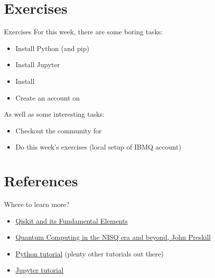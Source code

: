 \documentclass[aspectratio=43]{beamer}
\begin{document}
\section{Exercises}
\begin{frame}{Exercises}
    For this week, there are some boring tasks:
    \begin{itemize}
        \item Install Python (and pip)
        \item Install Jupyter
        \item Install \qk
        \item Create an account on \ibmqe
    \end{itemize}
    As well as some interesting tasks:
    \begin{itemize}
        \item Checkout the community for \qk
        \item Do this week's exercises (local setup of IBMQ account)
    \end{itemize}
\pagenumber
\end{frame}

        
        

\section{References}
\begin{frame}{Where to learn more?}
\begin{card}
    \begin{itemize}
        \item \href{https://medium.com/qiskit/qiskit-and-its-fundamental-elements-bcd7ead80492}{Qiskit and its Fundamental Elements}
        \item \href{https://arxiv.org/abs/1801.00862}{Quantum Computing in the NISQ era and beyond, John Preskill}
        \item \href{https://docs.python.org/3/tutorial/}{Python tutorial} (plenty other tutorials out there)
        \item \href{https://www.datacamp.com/community/tutorials/tutorial-jupyter-notebook}{Jupyter tutorial}
    \end{itemize}
\end{card}
\end{frame}
\end{document}
